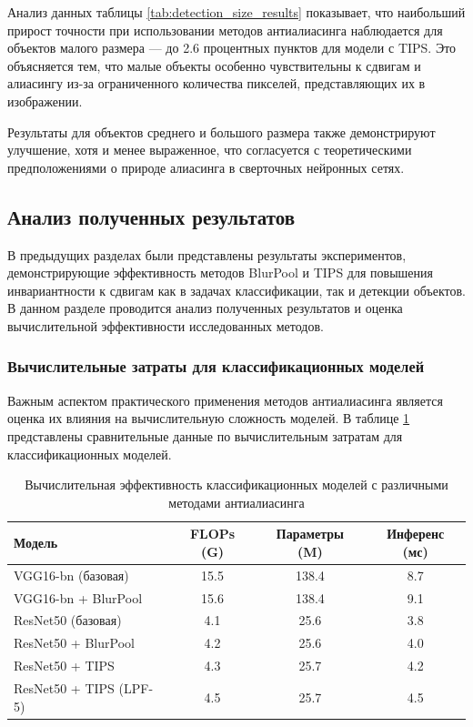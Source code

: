 Анализ данных таблицы \ref{tab:detection_size_results} показывает, что наибольший прирост точности при использовании методов антиалиасинга наблюдается для объектов малого размера — до 2.6 процентных пунктов для модели с TIPS. Это объясняется тем, что малые объекты особенно чувствительны к сдвигам и алиасингу из-за ограниченного количества пикселей, представляющих их в изображении.

Результаты для объектов среднего и большого размера также демонстрируют улучшение, хотя и менее выраженное, что согласуется с теоретическими предположениями о природе алиасинга в сверточных нейронных сетях.

\subsection{Анализ полученных результатов}
\label{sec:results:analysis}

В предыдущих разделах были представлены результаты экспериментов, демонстрирующие эффективность методов BlurPool и TIPS для повышения инвариантности к сдвигам как в задачах классификации, так и детекции объектов. В данном разделе проводится анализ полученных результатов и оценка вычислительной эффективности исследованных методов.

\subsubsection{Вычислительные затраты для классификационных моделей}

Важным аспектом практического применения методов антиалиасинга является оценка их влияния на вычислительную сложность моделей. В таблице \ref{tab:computational_efficiency_classification} представлены сравнительные данные по вычислительным затратам для классификационных моделей.

\begin{table}[h]
\centering
\caption{Вычислительная эффективность классификационных моделей с различными методами антиалиасинга}
\label{tab:computational_efficiency_classification}
\begin{tabular}{lccc}
\toprule
\textbf{Модель} & \textbf{FLOPs (G)} & \textbf{Параметры (M)} & \textbf{Инференс (мс)} \\
\midrule
VGG16-bn (базовая) & 15.5 & 138.4 & 8.7 \\
VGG16-bn + BlurPool & 15.6 & 138.4 & 9.1 \\
\midrule
ResNet50 (базовая) & 4.1 & 25.6 & 3.8 \\
ResNet50 + BlurPool & 4.2 & 25.6 & 4.0 \\
ResNet50 + TIPS & 4.3 & 25.7 & 4.2 \\
ResNet50 + TIPS (LPF-5) & 4.5 & 25.7 & 4.5 \\
\bottomrule
\end{tabular}
\end{table}

